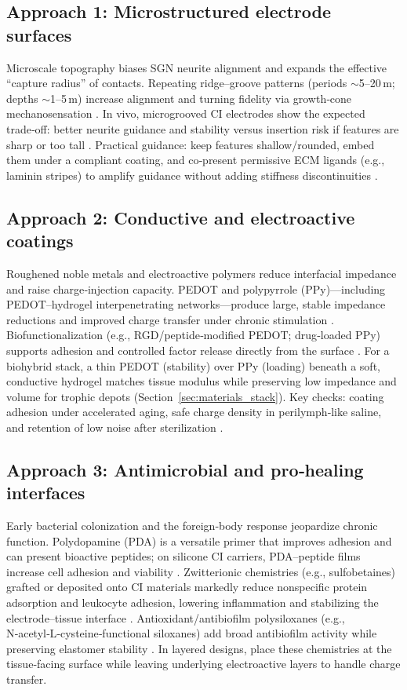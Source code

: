 \documentclass[referee,pdflatex, sn-vancouver-num]{sn-jnl}%
\theoremstyle{thmstyleone}%
\theoremstyle{thmstyletwo}%
\theoremstyle{thmstylethree}%
\begin{document}
\subsection{Approach 1: Microstructured electrode surfaces}
Microscale topography biases SGN neurite alignment and expands the effective “capture radius” of contacts. Repeating ridge–groove patterns (periods $\sim$5–20\,\textmu m; depths $\sim$1–5\,\textmu m) increase alignment and turning fidelity via growth‑cone mechanosensation \cite{Wang2013,Chen2014}. In vivo, microgrooved CI electrodes show the expected trade‑off: better neurite guidance and stability versus insertion risk if features are sharp or too tall \cite{Lee2019}. Practical guidance: keep features shallow/rounded, embed them under a compliant coating, and co‑present permissive ECM ligands (e.g., laminin stripes) to amplify guidance without adding stiffness discontinuities \cite{Evans2007LamininFibronectin,Vega1995LamininCollagenIV}.

\subsection{Approach 2: Conductive and electroactive coatings}
Roughened noble metals and electroactive polymers reduce interfacial impedance and raise charge‑injection capacity. PEDOT and polypyrrole (PPy)—including PEDOT–hydrogel interpenetrating networks—produce large, stable impedance reductions and improved charge transfer under chronic stimulation \cite{Venkatraman2011-ql,Goding2017,Dalrymple2020,ABIDIAN20081273}. Biofunctionalization (e.g., RGD/peptide‑modified PEDOT; drug‑loaded PPy) supports adhesion and controlled factor release directly from the surface \cite{Chikar2012,Richardson2007,Richardson2009}. For a biohybrid stack, a thin PEDOT (stability) over PPy (loading) beneath a soft, conductive hydrogel matches tissue modulus while preserving low impedance and volume for trophic depots (Section~\ref{sec:materials_stack}). Key checks: coating adhesion under accelerated aging, safe charge density in perilymph‑like saline, and retention of low noise after sterilization \cite{Venkatraman2011-ql,Dalrymple2020,Green2012}.

\subsection{Approach 3: Antimicrobial and pro‑healing interfaces}
Early bacterial colonization and the foreign‑body response jeopardize chronic function. Polydopamine (PDA) is a versatile primer that improves adhesion and can present bioactive peptides; on silicone CI carriers, PDA–peptide films increase cell adhesion and viability \cite{Schendzielorz2017}. Zwitterionic chemistries (e.g., sulfobetaines) grafted or deposited onto CI materials markedly reduce nonspecific protein adsorption and leukocyte adhesion, lowering inflammation and stabilizing the electrode–tissue interface \cite{Horne2023,Chen2023-ba}. Antioxidant/antibiofilm polysiloxanes (e.g., N‑acetyl‑L‑cysteine‑functional siloxanes) add broad antibiofilm activity while preserving elastomer stability \cite{Cozma2021-jb}. In layered designs, place these chemistries at the tissue‑facing surface while leaving underlying electroactive layers to handle charge transfer.
\end{document}
